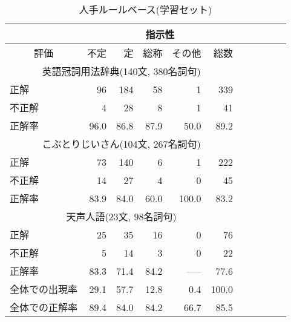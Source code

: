 \begin{table}[t]
\small

\caption{人手ルールベース(学習セット)}\label{tab:kanshi_d}

\begin{center}


{

\begin{tabular}[c]{|l|r|r|r|r|r|r|r|r|r|r|} \hline
 & \multicolumn{5}{c|}{指示性}   \\ \hline 
\multicolumn{1}{|c|}{評価}  &  不定  &  定 &  総称 &  その他 & 総数 \\\hline
\multicolumn{6}{|c|}{英語冠詞用法辞典(140文, 380名詞句)} \\ \hline 
   正解   &      96  &     184  &      58  &       1  &     339  \\
  不正解  &       4  &      28  &       8  &       1  &      41  \\
\hline 
 正解率&    96.0  &    86.8  &    87.9  &    50.0  &    89.2  \\\hline
\multicolumn{6}{|c|}{こぶとりじいさん(104文, 267名詞句)} \\ \hline 
   正解   &      73  &     140 &       6  &       1  &    222  \\
  不正解  &      14  &      27  &       4  &       0  &      45    \\
\hline
正解率&   83.9  &   84.0  &   60.0  &  100.0  &   83.2  \\\hline
\multicolumn{6}{|c|}{天声人語(23文, 98名詞句)} \\ \hline 
   正解   &      25  &     35 &      16  &       0  &    76  \\
  不正解  &       5  &      14  &       3  &       0  &      22 \\
\hline
正解率&    83.3  &    71.4  &    84.2  &    -----  &    77.6   \\\hline
全体での出現率 &  29.1  &  57.7   &  12.8   &  0.4  &  100.0   \\
全体での正解率 &  89.4  &  84.0   &  84.2   &  66.7   &  85.5  \\\hline
\end{tabular}
}
\end{center}
\end{table}

